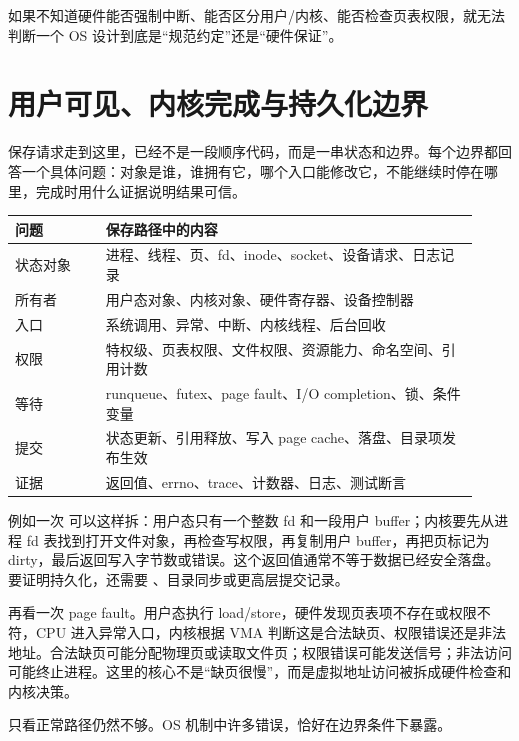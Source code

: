 如果不知道硬件能否强制中断、能否区分用户/内核、能否检查页表权限，就无法判断一个 OS 设计到底是“规范约定”还是“硬件保证”。

\section{用户可见、内核完成与持久化边界}

保存请求走到这里，已经不是一段顺序代码，而是一串状态和边界。每个边界都回答一个具体问题：对象是谁，谁拥有它，哪个入口能修改它，不能继续时停在哪里，完成时用什么证据说明结果可信。

\begin{longtable}{|p{0.18\linewidth}|p{0.74\linewidth}|}
\toprule
问题 & 保存路径中的内容 \\
\midrule
状态对象 & 进程、线程、页、fd、inode、socket、设备请求、日志记录 \\\tablerowrule
所有者 & 用户态对象、内核对象、硬件寄存器、设备控制器 \\\tablerowrule
入口 & 系统调用、异常、中断、内核线程、后台回收 \\\tablerowrule
权限 & 特权级、页表权限、文件权限、资源能力、命名空间、引用计数 \\\tablerowrule
等待 & runqueue、futex、page fault、I/O completion、锁、条件变量 \\\tablerowrule
提交 & 状态更新、引用释放、写入 page cache、落盘、目录项发布生效 \\\tablerowrule
证据 & 返回值、errno、trace、计数器、日志、测试断言 \\
\bottomrule
\end{longtable}

例如一次  可以这样拆：用户态只有一个整数 fd 和一段用户 buffer；内核要先从进程 fd 表找到打开文件对象，再检查写权限，再复制用户 buffer，再把页标记为 dirty，最后返回写入字节数或错误。这个返回值通常不等于数据已经安全落盘。要证明持久化，还需要 、目录同步或更高层提交记录。

再看一次 page fault。用户态执行 load/store，硬件发现页表项不存在或权限不符，CPU 进入异常入口，内核根据 VMA 判断这是合法缺页、权限错误还是非法地址。合法缺页可能分配物理页或读取文件页；权限错误可能发送信号；非法访问可能终止进程。这里的核心不是“缺页很慢”，而是虚拟地址访问被拆成硬件检查和内核决策。

只看正常路径仍然不够。OS 机制中许多错误，恰好在边界条件下暴露。


